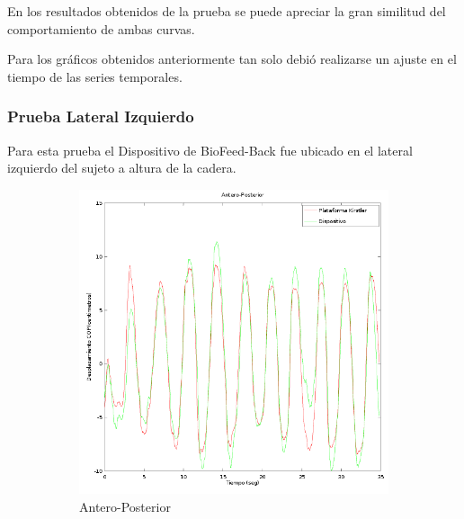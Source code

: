 \documentclass[12pt,a4paper]{article}
\newcommand{\nombreDispositivo}{Dispositivo de BioFeed-Back }
\begin{document}
	En los resultados obtenidos de la prueba se puede apreciar la gran similitud del comportamiento de ambas curvas.
	
	Para los gráficos obtenidos anteriormente tan solo debió realizarse un ajuste en el tiempo de las series temporales.



\newpage
\subsubsection{Prueba Lateral Izquierdo}
	Para esta prueba el \nombreDispositivo fue ubicado en el lateral izquierdo del sujeto a altura de la cadera.
		
	\begin{figure}[H]
		\centering
		\begin{subfigure}{.5\textwidth}
			\centering
			\includegraphics[width=1\linewidth]{images/pruebas/LateralIzquierdo/Antero-Posterior}
			\caption{Antero-Posterior}
			\label{fig:anteroPosteriorLateral}
		\end{subfigure}%
		\begin{subfigure}{.5\textwidth}
			\centering

\end{subfigure}
\end{figure}
\end{document}
